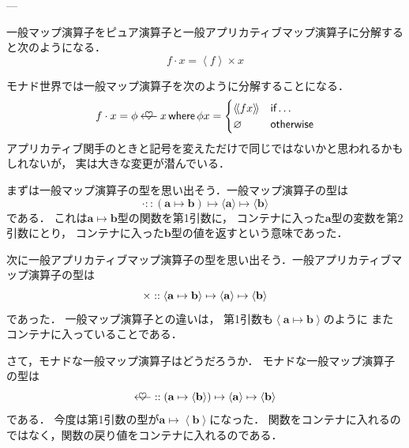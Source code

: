 \documentclass[a4paper]{jsbook}
\newcommand{\mathTypeParameter}[1]{\mathbf{#1}}
\newcommand{\mathPureWith}[1]{\left\langle#1\right\rangle}
\newcommand{\mathUnitWith}[1]{\left\langle\!\left\langle#1\right\rangle\!\right\rangle}
\newcommand{\mathPureNothing}{\varnothing}
\newcommand{\mathApplicativeGeneralMap}{\mathbin{\times}}
\newcommand{\mathBind}{\mathbin{\ooalign{$\longleftarrow$\crcr\hss$\heartsuit$\hss}}}
\newcommand{\mathGeneralMap}{\mathbin{\cdot}}
\newcommand{\mathIn}{\mathrel{::}}
\newcommand{\mathMapsTo}{\mapsto}
\newcommand{\mathKeyword}[1]{\operatorname{\textsf{#1}}}
\newcommand{\mathIf}{\mathKeyword{if}}
\newcommand{\mathOtherwise}{\mathKeyword{otherwise}}
\newcommand{\mathWhere}{\mathKeyword{where}}
\newcommand{\mathMorph}[2]{#1\mathMapsTo#2}
\newcommand{\mathMorphII}[3]{#1\mathMapsTo#2\mathMapsTo#3}
\begin{document}
---

一般マップ演算子をピュア演算子と一般アプリカティブマップ演算子に分解すると次のようになる．
\begin{equation}
f\mathGeneralMap x=\mathPureWith{f}\mathApplicativeGeneralMap x
\end{equation}

モナド世界では一般マップ演算子を次のように分解することになる．
\begin{equation}
f\mathGeneralMap x=\phi\mathBind x
\mathWhere
\phi x=\begin{cases}
\mathUnitWith{fx}&\mathIf\dots\\
\mathPureNothing&\mathOtherwise
\end{cases}
\end{equation}
アプリカティブ関手のときと記号を変えただけで同じではないかと思われるかもしれないが，
実は大きな変更が潜んでいる．

まずは一般マップ演算子の型を思い出そう．一般マップ演算子の型は
\begin{equation}
\mathGeneralMap
\mathIn{}\mathMorphII{(\mathMorph{\mathTypeParameter{a}}{\mathTypeParameter{b}})}{\langle\mathTypeParameter{a}\rangle}{\langle\mathTypeParameter{b}\rangle}
\end{equation}
である．
これは$\mathTypeParameter{a}\mapsto\mathTypeParameter{b}$型の関数を第1引数に，
コンテナに入った$\mathTypeParameter{a}$型の変数を第2引数にとり，
コンテナに入った$\mathTypeParameter{b}$型の値を返すという意味であった．

次に一般アプリカティブマップ演算子の型を思い出そう．一般アプリカティブマップ演算子の型は
\begin{equation}
\mathApplicativeGeneralMap
\mathIn{}\mathMorphII{\langle\mathMorph{\mathTypeParameter{a}}{\mathTypeParameter{b}}\rangle}{\langle\mathTypeParameter{a}\rangle}{\langle\mathTypeParameter{b}\rangle}\\
\end{equation}
であった．
一般マップ演算子との違いは，
第1引数も$\mathPureWith{\mathTypeParameter{a}\mapsto\mathTypeParameter{b}}$のように
またコンテナに入っていることである．

さて，モナドな一般マップ演算子はどうだろうか．
モナドな一般マップ演算子の型は
\begin{equation}
\mathBind
\mathIn{}\mathMorphII{(\mathMorph{\mathTypeParameter{a}}{\langle\mathTypeParameter{b}\rangle})}{\langle\mathTypeParameter{a}\rangle}{\langle{\mathTypeParameter{b}}\rangle}
\end{equation}
である．
今度は第1引数の型が$\mathTypeParameter{a}\mapsto\mathPureWith{\mathTypeParameter{b}}$になった．
関数をコンテナに入れるのではなく，関数の戻り値をコンテナに入れるのである．
\end{document}
